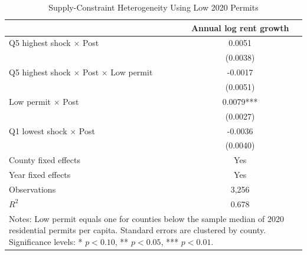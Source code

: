 \begin{table}[!htbp]\centering
\caption{Supply-Constraint Heterogeneity Using Low 2020 Permits}\label{tab:supply_heterogeneity}
\begin{tabular}{lc}\toprule
 & Annual log rent growth \\
\midrule
Q5 highest shock $\times$ Post & 0.0051 \\
 & (0.0038) \\
Q5 highest shock $\times$ Post $\times$ Low permit & -0.0017 \\
 & (0.0051) \\
Low permit $\times$ Post & 0.0079*** \\
 & (0.0027) \\
Q1 lowest shock $\times$ Post & -0.0036 \\
 & (0.0040) \\
\midrule
County fixed effects & Yes \\
Year fixed effects & Yes \\
Observations & 3,256 \\
$R^2$ & 0.678 \\
\bottomrule
\multicolumn{2}{p{0.76\textwidth}}{\footnotesize Notes: Low permit equals one for counties below the sample median of 2020 residential permits per capita. Standard errors are clustered by county. Significance levels: * $p<0.10$, ** $p<0.05$, *** $p<0.01$.}
\end{tabular}
\end{table}
